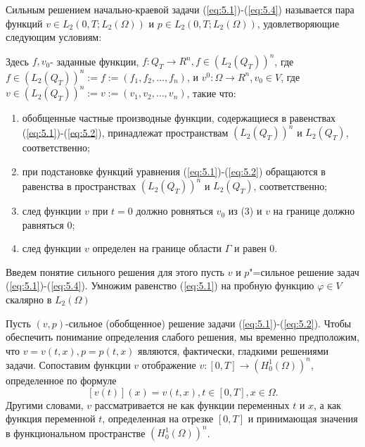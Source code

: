 \begin{definition}
    Сильным решением начально-краевой задачи (\ref{eq:5.1})-(\ref{eq:5.4}) называется пара функций $v\in L_2(0,T;L_2(\Omega))$ и
    $p\in L_2(0,T;L_2(\Omega))$, удовлетворяющие следующим условиям:
\end{definition}

Здесь $f,v_0$- заданные функции, $f:Q_T\rightarrow R^n, f\in (L_2(Q_T))^n$, где $f\in (L_2(Q_T))^n:={f:=(f_1,f_2,\dots,f_n)}$,
и $v^0:\Omega\rightarrow R^n,v_0\in V$, где $v\in (L_2(Q_T))^n:={v:=(v_1,v_2,\dots,v_n)}$, такие что:
\begin{enumerate} 
    \item обобщенные частные производные функции, содержащиеся в равенствах (\ref{eq:5.1})-(\ref{eq:5.2}), принадлежат пространствам $(L_2(Q_T))^n$ и $L_2(Q_T)$, соответственно;
    \item при подстановке функций уравнения (\ref{eq:5.1})-(\ref{eq:5.2}) обращаются в равенства в пространствах $(L_2(Q_T))^n$ и $L_2(Q_T)$, соответственно;
    \item след функции $v$ при $t=0$ должно ровняться $v_0$ из (3) и $v$ на границе должно равняться $0$;
    \item след функции $v$ определен на границе области $\Gamma$ и равен 0.
\end{enumerate}

Введем понятие сильного решения для этого пусть $v$ и $p$"=сильное решение задач (\ref{eq:5.1})-(\ref{eq:5.4}).
Умножим равенство (\ref{eq:5.1}) на пробную функцию $\varphi\in V$ скалярно в $L_2(\Omega)$

Пусть $(v,p)$-сильное (обобщенное) решение задачи (\ref{eq:5.1})-(\ref{eq:5.2}).
Чтобы обеспечить понимание определения слабого решения, мы временно предположим, что $v=v(t,x), p=p(t,x)$ являются, фактически, гладкими решениями задачи.
Сопоставим функции $v$ отображение $v:[0,T]\rightarrow (H^{1}_0(\Omega))^n$, определенное по формуле $$[v(t)](x)=v(t,x), t\in[0,T], x\in\Omega.$$
Другими словами, $v$ рассматривается не как функции переменных $t$ и $x$, а как функция переменной $t$, определенная на отрезке
$[0,T]$ и принимающая значения в функциональном пространстве $(H^{1}_0(\Omega))^n$.


